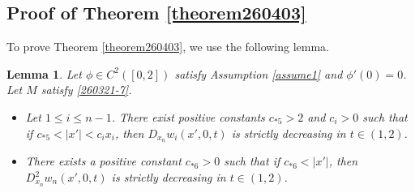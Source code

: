 \documentclass{amsart}
\newtheorem{lemma}[defn]{Lemma}
\numberwithin{equation}{section}
\begin{document}
 

 

 

  
  
  
 
\subsection{Proof of Theorem \ref{theorem260403} }
\label{mainsection2}

To prove Theorem \ref{theorem260403}, we use the following lemma.
\begin{lemma}\label{theorem1221-2}
Let $\phi \in C^2([0,2])$ satisfy Assumption \ref{assume1} and $ \phi'(0) =0$. Let $M$ satisfy \eqref{260321-7}.  
\begin{itemize}
\item[(i)]
Let $ 1 \leq i \leq n-1$. There exist positive constants $ c_{*5}>2$ and $c_i>0$  such that  if $c_{*5} < |x'| < c_i x_i $,  then $ D_{x_n} w_i(x', 0,t)$ is strictly decreasing  in $ t \in (1,2)$.

\item[(ii)] There exists  a  positive constant $c_{*6}>0$ such that   if $c_{*6} < |x'|   $,  then $ D^2_{x_n} w_n(x', 0,t)$ is strictly decreasing in $t \in (1,2)$.
\end{itemize}

\end{lemma}
\end{document}
